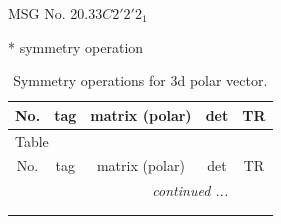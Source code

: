 \documentclass[fleqn,8pt]{jsarticle}
\begin{document}
\setcounter{MaxMatrixCols}{32}

\renewcommand{\tablename}{Table~}
\renewcommand{\figurename}{Figure~}
\begin{center}
\LARGE
MSG No. 20.33\quad$C2'2'2_{1}$
\end{center}
* symmetry operation
\renewcommand{\arraystretch}{1.3}
\begin{longtable}{ccccc}
\caption{Symmetry operations for 3d polar vector.}
 \\
 \hline \hline
No. & tag & matrix (polar) & det & TR \\ \hline \endfirsthead

\multicolumn{4}{l}{\tablename\ \thetable{}} \\
 \hline \hline
No. & tag & matrix (polar) & det & TR \\ \hline \endhead

 \hline \hline
\multicolumn{4}{r}{\footnotesize\it continued ...} \\ \endfoot

 \hline \hline
\multicolumn{4}{r}{} \\ \endlastfoot


\end{longtable}
\end{document}
